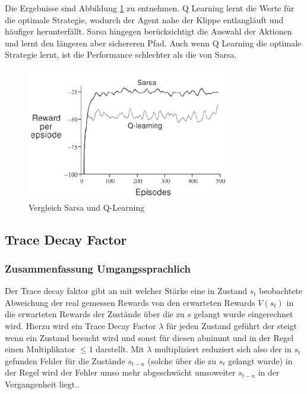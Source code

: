 \documentclass[10pt]{scrartcl}
\begin{document}
Die Ergebnisse sind Abbildung \ref{fig:Cliff_Result} zu entnehmen. Q Learning lernt die Werte für die optimale Strategie, wodurch der Agent nahe der Klippe entlangläuft und häufiger herunterfällt. Sarsa hingegen berücksichtigt die Auswahl der Aktionen und lernt den längeren aber sichereren Pfad. Auch wenn Q Learning die optimale Strategie lernt, ist die Performance schlechter als die von Sarsa.\\

\begin{figure}[htbp]
	\centering	\includegraphics[width=0.8\textwidth]{Bilder/Cliff_Ergebnisse.png}
	\caption{Vergleich Sarsa und Q-Learning}
	\label{fig:Cliff_Result}
\end{figure}


\subsection{Trace Decay Factor}
\subsubsection{Zusammenfassung Umgangssprachlich}
Der Trace decay faktor gibt an mit welcher Stärke eine in Zustand $s_t$ beobachtete Abweichung der real gemessen Rewards von den erwarteten Rewards $V(s_t)$ in die erwarteten Rewards der Zustände über die zu $s$ gelangt wurde eingerechnet wird.
Hierzu wird ein Trace Decay Factor $\lambda$ für jeden Zustand geführt der steigt wenn ein Zustand besucht wird und sonst für diesen abnimmt und in der Regel einen Multiplikator $\leq 1$ darstellt. Mit $\lambda$ multipliziert reduziert sich also der in $s_t$ gefunden Fehler für die Zustände $s_{t-n}$ (solche über die zu $s_t$ gelangt wurde) in der Regel wird der Fehler umso mehr abgeschwächt umsoweiter $s_{t-n}$ in der Vergangenheit liegt..
\end{document}

